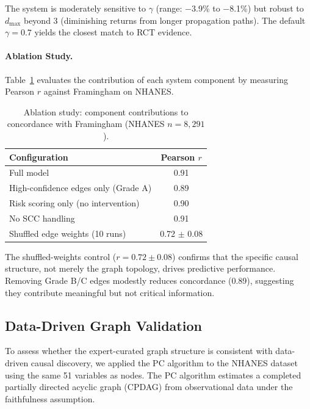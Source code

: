 \documentclass[runningheads]{llncs}
\begin{document}
The system is moderately sensitive to $\gamma$ (range: $-$3.9\% to
$-$8.1\%) but robust to $d_{\max}$ beyond 3 (diminishing returns from
longer propagation paths).  The default $\gamma = 0.7$ yields the
closest match to RCT evidence.

\paragraph{Ablation Study.}
Table~\ref{tab:ablation} evaluates the contribution of each system
component by measuring Pearson $r$ against Framingham on NHANES.

\begin{table}[t]
\centering
\caption{Ablation study: component contributions to concordance with
Framingham (NHANES $n = 8{,}291$).}
\label{tab:ablation}
\small
\begin{tabular}{@{}lc@{}}
\toprule
\textbf{Configuration} & \textbf{Pearson $r$} \\
\midrule
Full model                        & 0.91 \\
High-confidence edges only (Grade A) & 0.89 \\
Risk scoring only (no intervention) & 0.90 \\
No SCC handling                   & 0.91 \\
Shuffled edge weights (10 runs)   & 0.72 $\pm$ 0.08 \\
\bottomrule
\end{tabular}
\end{table}

The shuffled-weights control ($r = 0.72 \pm 0.08$) confirms that
the specific causal structure, not merely the graph topology,
drives predictive performance.  Removing Grade B/C edges modestly
reduces concordance (0.89), suggesting they contribute meaningful
but not critical information.

\subsection{Data-Driven Graph Validation}\label{sec:pcalg}

To assess whether the expert-curated graph structure is consistent
with data-driven causal discovery, we applied the PC algorithm
\cite{spirtes2000causation} to the NHANES dataset using the same
51 variables as nodes.  The PC algorithm estimates a completed
partially directed acyclic graph (CPDAG) from observational data
under the faithfulness assumption.
\end{document}
